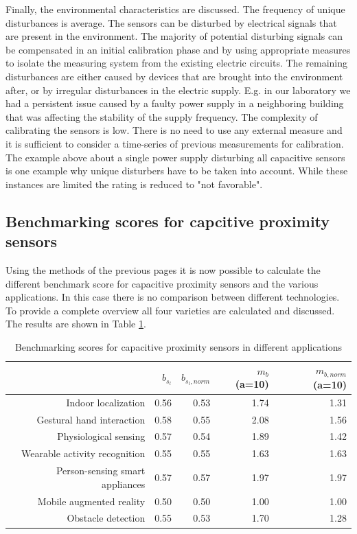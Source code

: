 Finally, the environmental characteristics are discussed. The frequency of unique disturbances is average. The sensors can be disturbed by electrical signals that are present in the environment. The majority of potential disturbing signals can be compensated in an initial calibration phase and by using appropriate measures to isolate the measuring system from the existing electric circuits. The remaining disturbances are either caused by devices that are brought into the environment after, or by irregular disturbances in the electric supply. E.g. in our laboratory we had a persistent issue caused by a faulty power supply in a neighboring building that was affecting the stability of the supply frequency. The complexity of calibrating the sensors is low. There is no need to use any external measure and it is sufficient to consider a time-series of previous measurements for calibration. The example above about a single power supply disturbing all capacitive sensors is one example why unique disturbers have to be taken into account. While these instances are limited the rating is reduced to "not favorable".


\subsection{Benchmarking scores for capcitive proximity sensors}

Using the methods of the previous pages it is now possible to calculate the different benchmark score for capacitive proximity sensors and the various applications. In this case there is no comparison between different technologies. To provide a complete overview all four varieties are calculated and discussed. The results are shown in Table \ref{tab:bench_capapps_scores}. 

\begin{table}[htbp]
  \centering
  \caption{Benchmarking scores for capacitive proximity sensors in different applications}
   \begin{tabular}{rrrrr}
    \toprule
          & $b_{s_l}$ & $b_{s_l,norm}$ & $m_b$ (a=10) & $m_{b,norm}$ (a=10) \\
    \midrule
    Indoor localization & 0.56  & 0.53  & 1.74  & 1.31 \\
    Gestural hand interaction & 0.58  & 0.55  & 2.08  & 1.56 \\
    Physiological sensing & 0.57  & 0.54  & 1.89  & 1.42 \\
    Wearable activity recognition & 0.55  & 0.55  & 1.63  & 1.63 \\
    Person-sensing smart appliances & 0.57  & 0.57  & 1.97  & 1.97 \\
    Mobile augmented reality & 0.50  & 0.50  & 1.00  & 1.00 \\
    Obstacle detection & 0.55  & 0.53  & 1.70  & 1.28 \\
    \bottomrule
    \end{tabular}%
  \label{tab:bench_capapps_scores}%
\end{table}%

